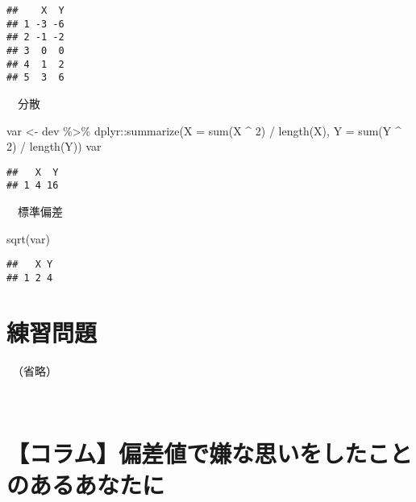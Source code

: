 \documentclass[
  12pt,
]{book}
\newenvironment{Shaded}{\begin{snugshade}}{\end{snugshade}}
\newcommand{\AttributeTok}[1]{\textcolor[rgb]{0.77,0.63,0.00}{#1}}
\newcommand{\DecValTok}[1]{\textcolor[rgb]{0.00,0.00,0.81}{#1}}
\newcommand{\FunctionTok}[1]{\textcolor[rgb]{0.00,0.00,0.00}{#1}}
\newcommand{\NormalTok}[1]{#1}
\newcommand{\OtherTok}[1]{\textcolor[rgb]{0.56,0.35,0.01}{#1}}
\newcommand{\SpecialCharTok}[1]{\textcolor[rgb]{0.00,0.00,0.00}{#1}}
\begin{document}
\begin{verbatim}
##    X  Y
## 1 -3 -6
## 2 -1 -2
## 3  0  0
## 4  1  2
## 5  3  6
\end{verbatim}

　分散

\begin{Shaded}
\begin{Highlighting}[]
\NormalTok{var }\OtherTok{\textless{}{-}}\NormalTok{ dev }\SpecialCharTok{\%\textgreater{}\%} 
\NormalTok{  dplyr}\SpecialCharTok{::}\FunctionTok{summarize}\NormalTok{(}\AttributeTok{X =} \FunctionTok{sum}\NormalTok{(X }\SpecialCharTok{\^{}} \DecValTok{2}\NormalTok{) }\SpecialCharTok{/} \FunctionTok{length}\NormalTok{(X), }\AttributeTok{Y =} \FunctionTok{sum}\NormalTok{(Y }\SpecialCharTok{\^{}} \DecValTok{2}\NormalTok{) }\SpecialCharTok{/} \FunctionTok{length}\NormalTok{(Y))}
\NormalTok{var}
\end{Highlighting}
\end{Shaded}

\begin{verbatim}
##   X  Y
## 1 4 16
\end{verbatim}

　標準偏差

\begin{Shaded}
\begin{Highlighting}[]
\FunctionTok{sqrt}\NormalTok{(var)}
\end{Highlighting}
\end{Shaded}

\begin{verbatim}
##   X Y
## 1 2 4
\end{verbatim}

\hypertarget{ux7df4ux7fd2ux554fux984c-3}{%
\section*{練習問題}\label{ux7df4ux7fd2ux554fux984c-3}}

　（省略）

　

\hypertarget{ux30b3ux30e9ux30e0ux504fux5deeux5024ux3067ux5accux306aux601dux3044ux3092ux3057ux305fux3053ux3068ux306eux3042ux308bux3042ux306aux305fux306b}{%
\section*{【コラム】偏差値で嫌な思いをしたことのあるあなたに}\label{ux30b3ux30e9ux30e0ux504fux5deeux5024ux3067ux5accux306aux601dux3044ux3092ux3057ux305fux3053ux3068ux306eux3042ux308bux3042ux306aux305fux306b}}
\end{document}
